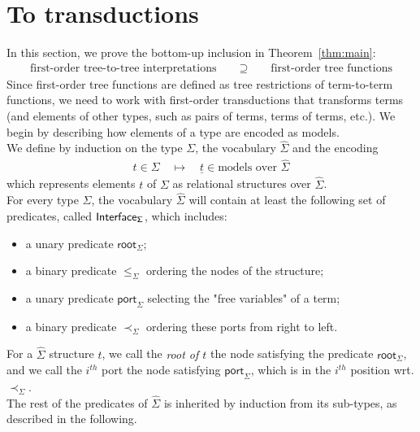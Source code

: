 \newcommand{\Root}[1]{\mathsf{root}_{#1}}
\newcommand{\Port}[1]{\mathsf{port}_{#1}}
\newcommand{\Interface}[1]{\mathsf{Interface}_{#1}}
\section{To transductions}
\label{sec:to-transductions}
In this section, we prove the bottom-up inclusion in Theorem~\ref{thm:main}:
\begin{align*}
    \text{first-order tree-to-tree interpretations} \qquad \supseteq \qquad \text{first-order tree functions}
\end{align*}
Since first-order tree functions are defined as tree restrictions of term-to-term functions, we need to work with first-order transductions that transforms terms (and elements of other types, such as pairs of terms, terms of terms, etc.). We begin by describing how elements of a type are encoded as models. 
\\

We define by induction on the type $\Sigma$, the vocabulary $\hat \Sigma$ and the encoding 
 \begin{align*}
     t \in \Sigma \quad \mapsto \quad \underline t \in \text{models over $\hat \Sigma$}
 \end{align*}
 which represents elements $t$ of $\Sigma$ as relational structures over $\hat \Sigma$.
 \\
 
 For every type $\Sigma$, the vocabulary $\hat \Sigma$ will contain at least the following set of predicates, called $\sf{Interface}_\Sigma$, which includes:
 \begin{itemize}
 \item a unary predicate $\Root{\Sigma}$;
 \item a binary predicate $\leq_\Sigma$ ordering the nodes of the structure;
  \item a unary predicate $\Port{\Sigma}$ selecting the "free variables" of a term; 
 \item a binary predicate $\prec_\Sigma$ ordering these ports from right to left.  
\end{itemize}  

For a $\hat\Sigma$ structure $t$, we call the \emph{root of $t$} the node satisfying the predicate $\Root{\Sigma}$, and we call {the $i^{th}$ port} the node satisfying $\Port\Sigma$, which is in the $i^{th}$ position wrt. $\prec_\Sigma$. 
\\

The rest of the predicates of $\hat \Sigma$ is inherited by induction from its sub-types, as described in the following.\\

